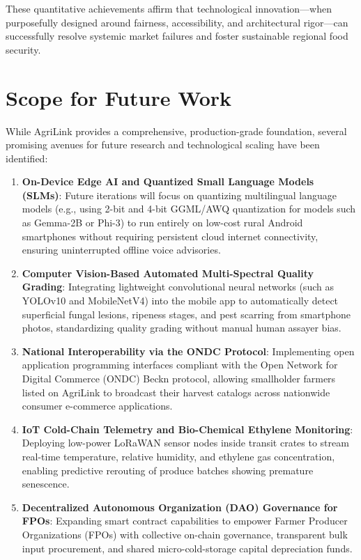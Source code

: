 These quantitative achievements affirm that technological innovation---when purposefully designed around fairness, accessibility, and architectural rigor---can successfully resolve systemic market failures and foster sustainable regional food security.

\section{Scope for Future Work}
\label{sec:Future_Work}
While AgriLink provides a comprehensive, production-grade foundation, several promising avenues for future research and technological scaling have been identified:

\begin{enumerate}[label=\textbf{\arabic*.}]
	\item \textbf{On-Device Edge AI and Quantized Small Language Models (SLMs)}: Future iterations will focus on quantizing multilingual language models (e.g., using 2-bit and 4-bit GGML/AWQ quantization for models such as Gemma-2B or Phi-3) to run entirely on low-cost rural Android smartphones without requiring persistent cloud internet connectivity, ensuring uninterrupted offline voice advisories.
	
	\item \textbf{Computer Vision-Based Automated Multi-Spectral Quality Grading}: Integrating lightweight convolutional neural networks (such as YOLOv10 and MobileNetV4) into the mobile app to automatically detect superficial fungal lesions, ripeness stages, and pest scarring from smartphone photos, standardizing quality grading without manual human assayer bias.
	
	\item \textbf{National Interoperability via the ONDC Protocol}: Implementing open application programming interfaces compliant with the Open Network for Digital Commerce (ONDC) Beckn protocol, allowing smallholder farmers listed on AgriLink to broadcast their harvest catalogs across nationwide consumer e-commerce applications.
	
	\item \textbf{IoT Cold-Chain Telemetry and Bio-Chemical Ethylene Monitoring}: Deploying low-power LoRaWAN sensor nodes inside transit crates to stream real-time temperature, relative humidity, and ethylene gas concentration, enabling predictive rerouting of produce batches showing premature senescence.
	
	\item \textbf{Decentralized Autonomous Organization (DAO) Governance for FPOs}: Expanding smart contract capabilities to empower Farmer Producer Organizations (FPOs) with collective on-chain governance, transparent bulk input procurement, and shared micro-cold-storage capital depreciation funds.
\end{enumerate}

\chapterend
\cleardoublepage